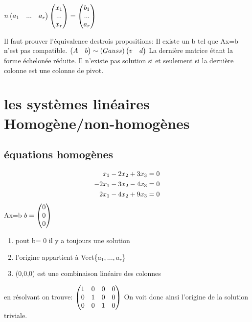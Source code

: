 \documentclass[a4paper,10pt]{article}
\begin{document}
$n
\begin{pmatrix}
 a_1&...&a_r\cr
\end{pmatrix}
\begin{pmatrix}
 x_1\cr
 ...\cr
 x_r\cr
\end{pmatrix}
=
\begin{pmatrix}
 b_1\cr
 ...\cr
 a_r\cr
\end{pmatrix}
$

Il faut prouver l'équivalence des\newline trois propositions:
\newline
Il existe un b tel que Ax=b n'est pas compatible.
\newline
$
\begin{pmatrix}
 A&b\cr
\end{pmatrix}
\sim(Gauss)
\begin{pmatrix}
 v&d\cr
\end{pmatrix}
$
\newline
La dernière matrice étant la forme échelonée réduite. Il n'existe pas solution si et seulement si la dernière colonne est une colonne de pivot.

\section{les systèmes linéaires Homogène/non-homogènes}
\subsection{équations homogènes}
\begin{eqnarray}
x_1-2x_2+3x_3=0\cr
-2x_1-3x_2-4x_3=0\cr
2x_1-4x_2+9x_3=0\cr
\end{eqnarray}
Ax=b
\newline
$b=
\begin{pmatrix}
 0\cr
 0\cr
 0\cr
\end{pmatrix}
$
\begin{enumerate}
 \item pout b= 0 il y a toujours une solution
 \item l'origine appartient à Vect\{$a_1,...,a_r$\}
 \item (0,0,0) est une combinaison linéaire des colonnes
\end{enumerate}
en résolvant on trouve:
\newline
$
\begin{pmatrix}
 1&0&0&0\cr
 0&1&0&0\cr
 0&0&1&0\cr
\end{pmatrix}
$
On voit donc ainsi l'origine de la solution triviale.
\end{document}
